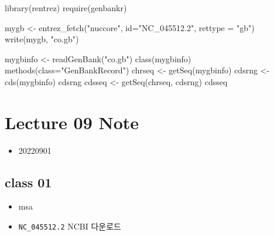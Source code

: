 \documentclass[
]{book}
\newenvironment{Shaded}{\begin{snugshade}}{\end{snugshade}}
\newcommand{\AttributeTok}[1]{\textcolor[rgb]{0.77,0.63,0.00}{#1}}
\newcommand{\FunctionTok}[1]{\textcolor[rgb]{0.00,0.00,0.00}{#1}}
\newcommand{\NormalTok}[1]{#1}
\newcommand{\OtherTok}[1]{\textcolor[rgb]{0.56,0.35,0.01}{#1}}
\newcommand{\StringTok}[1]{\textcolor[rgb]{0.31,0.60,0.02}{#1}}
\providecommand{\tightlist}{%
  \setlength{\itemsep}{0pt}\setlength{\parskip}{0pt}}
\begin{document}
\begin{Shaded}
\begin{Highlighting}[]
\FunctionTok{library}\NormalTok{(rentrez)}
\FunctionTok{require}\NormalTok{(genbankr)}

\NormalTok{mygb }\OtherTok{\textless{}{-}} \FunctionTok{entrez\_fetch}\NormalTok{(}\StringTok{"nuccore"}\NormalTok{, }\AttributeTok{id=}\StringTok{"NC\_045512.2"}\NormalTok{, }\AttributeTok{rettype =} \StringTok{"gb"}\NormalTok{)}
\FunctionTok{write}\NormalTok{(mygb, }\StringTok{"co.gb"}\NormalTok{)}

\NormalTok{mygbinfo }\OtherTok{\textless{}{-}} \FunctionTok{readGenBank}\NormalTok{(}\StringTok{"co.gb"}\NormalTok{)}
\FunctionTok{class}\NormalTok{(mygbinfo)}
\FunctionTok{methods}\NormalTok{(}\AttributeTok{class=}\StringTok{"GenBankRecord"}\NormalTok{)}
\NormalTok{chrseq }\OtherTok{\textless{}{-}} \FunctionTok{getSeq}\NormalTok{(mygbinfo)}
\NormalTok{cdsrng }\OtherTok{\textless{}{-}} \FunctionTok{cds}\NormalTok{(mygbinfo)}
\NormalTok{cdsrng}
\NormalTok{cdsseq }\OtherTok{\textless{}{-}} \FunctionTok{getSeq}\NormalTok{(chrseq, cdsrng)}
\NormalTok{cdsseq}
\end{Highlighting}
\end{Shaded}

\hypertarget{lecture-09-note}{%
\chapter{Lecture 09 Note}\label{lecture-09-note}}

\begin{itemize}
\tightlist
\item
  20220901
\end{itemize}

\hypertarget{class-01-4}{%
\section{class 01}\label{class-01-4}}

\begin{itemize}
\tightlist
\item
  msa
\item
  \texttt{NC\_045512.2} NCBI 다운로드
\end{itemize}
\end{document}
